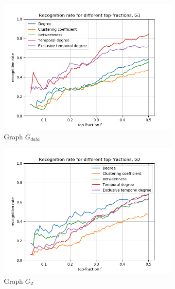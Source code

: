 \documentclass[letterpaper]{article}
\begin{document}
\begin{figure}
    \centering
    \begin{subfigure}[b]{0.32\textwidth}
        \includegraphics[width=\textwidth]{img/rankG.png}
        \caption{Graph \(G_{data}\)}
	    \label{fig:recognition_rates_G}
    \end{subfigure}
    \begin{subfigure}[b]{0.32\textwidth}
        \includegraphics[width=\textwidth]{img/rankG2.png}
        \caption{Graph \(G_2\)}
	    \label{fig:recognition_rates_G2}
    \end{subfigure}
    \begin{subfigure}[b]{0.32\textwidth}

\end{subfigure}
\end{figure}
\end{document}
